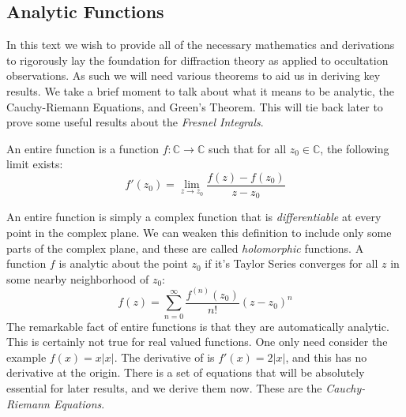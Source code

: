 \documentclass[crop=false,class=book,oneside]{standalone}
\begin{document}
        \subsection{Analytic Functions}
            In this text we wish to provide all of the necessary
            mathematics and derivations to rigorously lay the foundation
            for diffraction theory as applied to occultation
            observations. As such we will need various theorems
            to aid us in deriving key results. We take a brief
            moment to talk about what it means to be analytic,
            the Cauchy-Riemann Equations, and Green's Theorem.
            This will tie back later to prove some useful results about
            the \textit{Fresnel Integrals}.
            \begin{definition}
                An entire function is a function
                $f:\mathbb{C}\rightarrow\mathbb{C}$ such that
                for all $z_{0}\in\mathbb{C}$, the following limit
                exists:
                \begin{equation}
                    f'(z_{0})=\underset{z\rightarrow{z_{0}}}{\lim}
                    \frac{f(z)-f(z_{0})}{z-z_{0}}
                \end{equation}
            \end{definition}
            An entire function is simply a complex function that
            is \textit{differentiable} at every point in the
            complex plane. We can weaken this definition to include
            only some parts of the complex plane, and these are
            called \textit{holomorphic} functions.
            A function $f$ is analytic about the point $z_{0}$
            if it's Taylor Series converges for all $z$ in some
            nearby neighborhood of $z_{0}$:
            \begin{equation}
                f(z)=\sum_{n=0}^{\infty}\frac{f^{(n)}(z_{0})}{n!}
                (z-z_{0})^{n}
            \end{equation}
            The remarkable fact of entire functions
            is that they are automatically analytic.
            This is certainly not true for real valued functions.
            One only need consider the example
            $f(x)=x|x|$. The derivative of is
            $f'(x)=2|x|$, and this has no derivative at the
            origin. There is a set of equations that will be
            absolutely essential for later results, and we derive
            them now. These are the \textit{Cauchy-Riemann Equations}.
\end{document}
